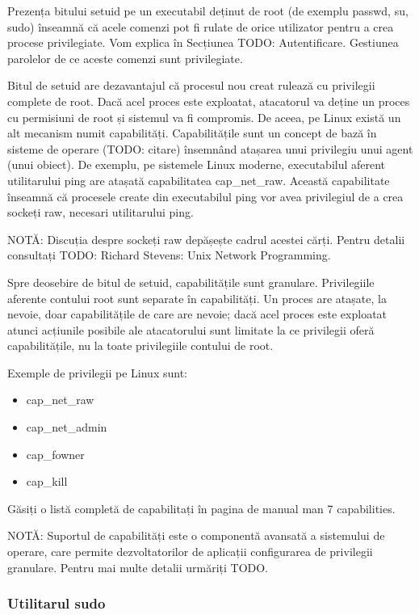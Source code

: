 Prezența bitului setuid pe un executabil deținut de root (de exemplu passwd, su,
sudo) înseamnă că acele comenzi pot fi rulate de orice utilizator pentru a crea
procese privilegiate. Vom explica în Secțiunea TODO: Autentificare. Gestiunea
parolelor de ce aceste comenzi sunt privilegiate.

Bitul de setuid are dezavantajul că procesul nou creat rulează cu privilegii
complete de root. Dacă acel proces este exploatat, atacatorul va deține un
proces cu permisiuni de root și sistemul va fi compromis. De aceea, pe Linux
există un alt mecanism numit capabilități. Capabilitățile sunt un concept de
bază în sisteme de operare (TODO: citare) însemnând atașarea unui privilegiu
unui agent (unui obiect). De exemplu, pe sistemele Linux moderne, executabilul
aferent utilitarului ping are atașată capabilitatea cap_net_raw. Această
capabilitate înseamnă că procesele create din executabilul ping vor avea
privilegiul de a crea sockeți raw, necesari utilitarului ping.

NOTĂ: Discuția despre sockeți raw depășește cadrul acestei cărți. Pentru detalii
consultați TODO: Richard Stevens: Unix Network Programming.

Spre deosebire de bitul de setuid, capabilitățile sunt granulare. Privilegiile
aferente contului root sunt separate în capabilități. Un proces are atașate, la
nevoie, doar capabilitățile de care are nevoie; dacă acel proces este exploatat
atunci acțiunile posibile ale atacatorului sunt limitate la ce privilegii oferă
capabilitățile, nu la toate privilegiile contului de root.

Exemple de privilegii pe Linux sunt:

\begin{itemize}
	\item cap_net_raw
	\item cap_net_admin
	\item cap_fowner
	\item cap_kill
\end{itemize}

Găsiți o listă completă de capabilitați în pagina de manual man 7 capabilities.

NOTĂ: Suportul de capabilități este o componentă avansată a sistemului de
operare, care permite dezvoltatorilor de aplicații configurarea de privilegii
granulare. Pentru mai multe detalii urmăriți TODO.

\subsubsection{Utilitarul sudo}
\label{sec:users-superuser-altroot-sudo}

